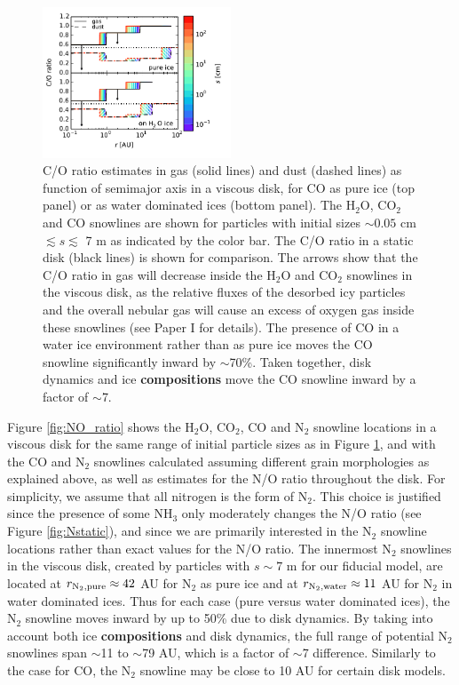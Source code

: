 \documentclass[apj]{emulateapj}
\begin{document}
\begin{figure}[h!]
\centering
\includegraphics[width=0.5\textwidth]{C_O_water_ice.pdf}
\caption{C/O ratio estimates in gas (solid lines) and dust (dashed lines) as function of semimajor axis in a viscous disk, for CO as pure ice (top panel) or as water dominated ices (bottom panel). The H$_2$O, CO$_2$ and CO snowlines are shown for particles with initial sizes $\sim0.05$ cm $\lesssim s \lesssim$ 7 m as indicated by the color bar. The C/O ratio in a static disk (black lines) is shown for comparison. The arrows show that the C/O ratio in gas will decrease inside the H$_2$O and CO$_2$
snowlines in the viscous disk, as the relative fluxes of the desorbed icy
particles and the overall nebular gas will cause an excess of oxygen gas inside these snowlines (see Paper I for details). The presence of CO in a water ice environment rather than as pure ice moves the CO snowline significantly inward by $\sim$70\%. Taken together, disk dynamics and ice \textbf{compositions} move the CO snowline inward by a factor of $\sim$7.} 
\label{fig:CO_ratio}
\end{figure}


Figure \ref{fig:NO_ratio} shows the H$_2$O, CO$_2$, CO and N$_2$ snowline locations in a viscous disk for the same range of initial particle sizes as in Figure \ref{fig:CO_ratio}, and with the CO and N$_2$ snowlines calculated assuming different grain morphologies as explained above, as well as estimates for the N/O ratio throughout the disk. For simplicity, we assume that all nitrogen is the form of N$_2$. This choice is justified since the presence of some NH$_3$ only moderately changes the N/O ratio (see Figure \ref{fig:Nstatic}), and since we are primarily interested in the N$_2$ snowline locations rather than exact values for the N/O ratio. The innermost N$_2$ snowlines in the viscous disk, created by particles with $s \sim 7$ m for our fiducial model, are located at $r_{\rm N_2, pure} \approx 42$ AU for N$_2$ as pure ice and at $r_{\rm N_2, water} \approx 11$ AU for N$_2$ in water dominated ices. Thus for each case (pure versus water dominated ices), the N$_2$ snowline moves inward by up to 50\% due to disk dynamics. By taking into account both ice \textbf{compositions} and disk dynamics, the full range of potential N$_2$ snowlines span $\sim$11 to $\sim$79 AU, which is a factor of $\sim$7 difference. Similarly to the case for CO, the N$_2$ snowline may be close to 10 AU for certain disk models. 
\end{document}
